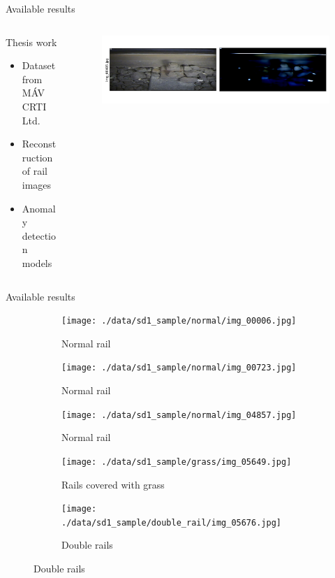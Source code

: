 \documentclass[aspectratio=169]{beamer}
\begin{document}
\begin{frame}{Available results}
    \begin{columns}[T]
        \begin{column}{0.45\textwidth}
            Thesis work
            \begin{itemize}
                \item Dataset from MÁV CRTI Ltd.
                \item Reconstruction of rail images
                \item Anomaly detection models
            \end{itemize}
        \end{column}
        \begin{column}{0.45\textwidth}
            \begin{figure}
                \centering
                \includegraphics[width=\columnwidth,trim={0 1cm 0 1cm},clip]{./results/vgg19_vgg19/20230510_172958_predict_0.png}
            \end{figure}
        \end{column}
    \end{columns}
\end{frame}

\begin{frame}{Available results}
    \begin{figure}
        \centering
        \begin{subfigure}{0.3\textwidth}
            \centering
            \texttt{[image: ./data/sd1\_sample/normal/img\_00006.jpg]}
            \caption*{Normal rail}
        \end{subfigure}
        \begin{subfigure}{0.3\textwidth}
            \centering
            \texttt{[image: ./data/sd1\_sample/normal/img\_00723.jpg]}
            \caption*{Normal rail}
        \end{subfigure}
        \begin{subfigure}{0.3\textwidth}
            \centering
            \texttt{[image: ./data/sd1\_sample/normal/img\_04857.jpg]}
            \caption*{Normal rail}
        \end{subfigure}
        \begin{subfigure}{0.3\textwidth}
            \centering
            \texttt{[image: ./data/sd1\_sample/grass/img\_05649.jpg]}
            \caption*{Rails covered with grass}
        \end{subfigure}
        \begin{subfigure}{0.3\textwidth}
            \centering
            \texttt{[image: ./data/sd1\_sample/double\_rail/img\_05676.jpg]}
            \caption*{Double rails}
        \end{subfigure}
    \end{figure}
\end{frame}
\end{document}
